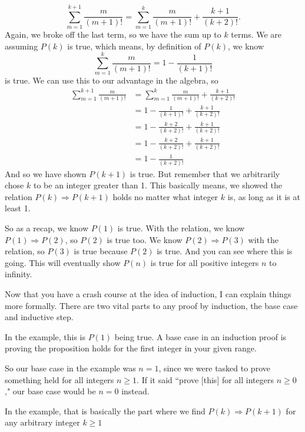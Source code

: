 \documentclass[11pt]{scrartcl}
\begin{document}
\[\sum_{m=1}^{k+1}\frac{m}{(m+1)!} = \sum_{m=1}^{k}\frac{m}{(m+1)!} + \frac{k+1}{(k+2)!}.\] Again, we broke off the last term, so we have the sum up to $k$ terms. We are assuming $P(k)$ is true, which means, by definition of $P(k)$, we know \[\sum_{m=1}^{k}\frac{m}{(m+1)!} = 1 - \frac{1}{(k+1)!}\] is true. We can use this to our advantage in the algebra, so
\begin{align*}
\sum_{m=1}^{k+1}\frac{m}{(m+1)!} &= \sum_{m=1}^{k}\frac{m}{(m+1)!} + \frac{k+1}{(k+2)!} \\
&= 1 - \frac{1}{(k+1)!} + \frac{k+1}{(k+2)!} \\
&= 1 - \frac{k+2}{(k+2)!} + \frac{k+1}{(k+2)!} \\
&= 1 - \frac{k+2}{(k+2)!} + \frac{k+1}{(k+2)!} \\
&= 1 - \frac{1}{(k+2)!}
\end{align*}
And so we have shown $P(k+1)$ is true. But remember that we arbitrarily chose $k$ to be an integer greater than 1. This basically means, we showed the relation $P(k) \Rightarrow P(k+1)$ holds no matter what integer $k$ is, as long as it is at least 1.

So as a recap, we know $P(1)$ is true. With the relation, we know $P(1) \Rightarrow P(2)$, so $P(2)$ is true too. We know $P(2) \Rightarrow P(3)$ with the relation, so $P(3)$ is true because $P(2)$ is true. And you can see where this is going. This will eventually show $P(n)$ is true for all positive integers $n$ to infinity.

Now that you have a crash course at the idea of induction, I can explain things more formally. There are two vital parts to any proof by induction, the base case and inductive step.

\begin{definition}
In the example, this is $P(1)$ being true. A base case in an induction proof is proving the proposition holds for the first integer in your given range.
\end{definition}

So our base case in the example was $n = 1$, since we were tasked to prove something held for all integers $n \geq 1$. If it said ``prove [this] for all integers $n \geq 0$," our base case would be $n = 0$ instead.

\begin{definition}
In the example, that is basically the part where we find $P(k) \Rightarrow P(k+1)$ for any arbitrary integer $k \geq 1$
\end{definition}
\end{document}
